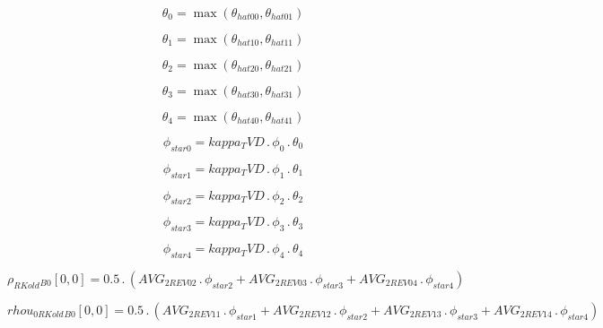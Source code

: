 \documentclass{article}
\begin{document}
\begin{dmath}\theta_{0} = \max\left(\theta_{hat 00}, \theta_{hat 01}\right)\end{dmath}

\begin{dmath}\theta_{1} = \max\left(\theta_{hat 10}, \theta_{hat 11}\right)\end{dmath}

\begin{dmath}\theta_{2} = \max\left(\theta_{hat 20}, \theta_{hat 21}\right)\end{dmath}

\begin{dmath}\theta_{3} = \max\left(\theta_{hat 30}, \theta_{hat 31}\right)\end{dmath}

\begin{dmath}\theta_{4} = \max\left(\theta_{hat 40}, \theta_{hat 41}\right)\end{dmath}

\begin{dmath}\phi_{star 0} = kappa_TVD \,.\, \phi_{0} \,.\, \theta_{0}\end{dmath}

\begin{dmath}\phi_{star 1} = kappa_TVD \,.\, \phi_{1} \,.\, \theta_{1}\end{dmath}

\begin{dmath}\phi_{star 2} = kappa_TVD \,.\, \phi_{2} \,.\, \theta_{2}\end{dmath}

\begin{dmath}\phi_{star 3} = kappa_TVD \,.\, \phi_{3} \,.\, \theta_{3}\end{dmath}

\begin{dmath}\phi_{star 4} = kappa_TVD \,.\, \phi_{4} \,.\, \theta_{4}\end{dmath}

\begin{dmath}{\rho_{RKold}{_{B0}}}[{0,0}] = 0.5 \,.\, \left(AVG_{2 REV 02} \,.\, \phi_{star 2} + AVG_{2 REV 03} \,.\, \phi_{star 3} + AVG_{2 REV 04} \,.\, \phi_{star 4}\right)\end{dmath}

\begin{dmath}{rhou_{0 RKold}{_{B0}}}[{0,0}] = 0.5 \,.\, \left(AVG_{2 REV 11} \,.\, \phi_{star 1} + AVG_{2 REV 12} \,.\, \phi_{star 2} + AVG_{2 REV 13} \,.\, \phi_{star 3} + AVG_{2 REV 14} \,.\, \phi_{star 4}\right)\end{dmath}
\end{document}
